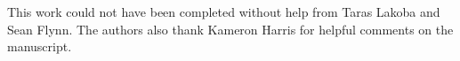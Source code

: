 This work could not have been completed without help from Taras Lakoba and Sean Flynn.
The authors also thank Kameron Harris for helpful comments on the manuscript.